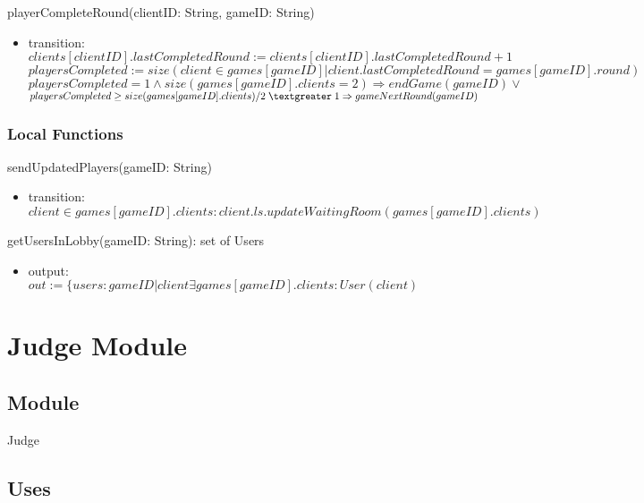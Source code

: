 \documentclass[12pt, titlepage]{article}
\begin{document}
\noindent playerCompleteRound(clientID: String, gameID: String)
\begin{itemize}
\item transition: \\ 
$clients[clientID].lastCompletedRound := clients[clientID].lastCompletedRound + 1$ \\
$playersCompleted := size(client \in games[gameID] | client.lastCompletedRound = games[gameID].round)$ \\ 
$playersCompleted = 1 \land size(games[gameID].clients = 2) \Rightarrow endGame(gameID) \lor$ \\ 
$playersCompleted \geq size(games[gameID].clients)/2 \;\textgreater\; 1 \Rightarrow gameNextRound(gameID)$ \\ 
\end{itemize}


\subsubsection{Local Functions}

\noindent sendUpdatedPlayers(gameID: String)
\begin{itemize}
\item transition: \\ $client \in games[gameID].clients: client.ls.updateWaitingRoom(games[gameID].clients)$
\end{itemize}

\noindent getUsersInLobby(gameID: String): set of Users
\begin{itemize}
\item output: $out := \{ users: gameID | client \exists games[gameID].clients : User(client)$
\end{itemize}


\newpage

\section{Judge Module} \label{Judge}

\subsection{Module}

Judge

\subsection{Uses}
\\
\\
\end{document}
